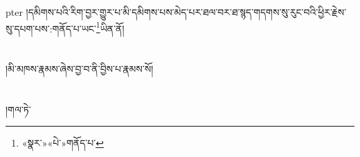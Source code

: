 pter{ }།དམིགས་པའི་རིག་བྱར་གྱུར་པ་མི་དམིགས་པས་མེད་པར་ཐལ་བར་ཐ་སྙད་གདགས་སུ་རུང་བའི་ཕྱིར་རྗེས་སུ་དཔག་པས་:གནོད་པ་ཡང་\footnote{«སྣར་»«པེ་»གནོད་པ་}ཡིན་ནོ།\chapter{ }།མི་མཁས་རྣམས་ཞེས་བྱ་བ་ནི་བྱིས་པ་རྣམས་སོ།\chapter{ }།གལ་ཏེ་
